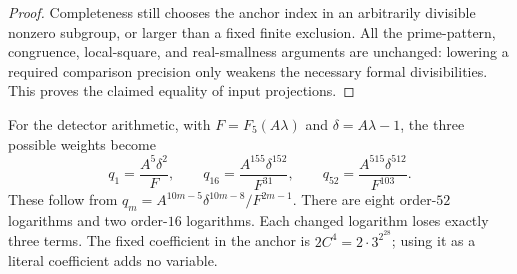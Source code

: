 \begin{proof}
Completeness still chooses the anchor index in an arbitrarily
divisible nonzero subgroup, or larger than a fixed finite exclusion.
All the prime-pattern, congruence, local-square, and real-smallness
arguments are unchanged: lowering a required comparison precision
only weakens the necessary formal divisibilities.  This proves the
claimed equality of input projections.
\end{proof}

For the detector arithmetic, with $F=F_5(A\lambda)$ and
$\delta=A\lambda-1$, the three possible weights become
\[
 q_1=\frac{A^5\delta^2}{F},\qquad
 q_{16}=\frac{A^{155}\delta^{152}}{F^{31}},\qquad
 q_{52}=\frac{A^{515}\delta^{512}}{F^{103}}.
\]
These follow from $q_m=A^{10m-5}\delta^{10m-8}/F^{2m-1}$.
There are eight order-$52$ logarithms and two order-$16$
logarithms.  Each changed logarithm loses exactly three terms.
The fixed coefficient in the anchor is $2C^4=2\cdot3^{2^{28}}$;
using it as a literal coefficient adds no variable.
